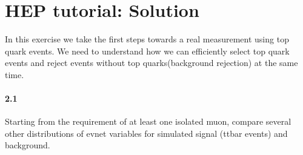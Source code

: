 \documentclass[11pt]{article}
\begin{document}
\setcounter{section}{1}
\section{HEP tutorial: Solution}
In this exercise we take the first steps towards a real measurement using top quark events. We need to understand how we can efficiently select top quark events and reject events without top quarks(background rejection) at the same time.

\paragraph{2.1}
Starting from the requirement of at least one isolated muon, compare several other distributions of evnet variables for simulated signal (ttbar events) and background.


\begin{lstlisting}[emph={if,while,continue,new},emphstyle=\color{nut}]

\end{lstlisting}
\end{document}
